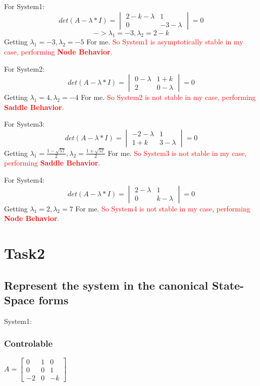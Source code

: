 \documentclass[12pt,a4paper,oneside]{ctexart}
\begin{document}
    For System1:
    $$det(A-\lambda*I) =\begin{vmatrix}
       2-k-\lambda & 1 \\
       0 & -3-\lambda 
    \end{vmatrix} = 0$$
    $$ ->\lambda_1 = -3, \lambda_2 = 2-k $$
    Getting $\lambda_1 = -3, \lambda_2 = -5$ For me.
    \textcolor{red}{So System1 is asymptotically stable in my case, performing \textbf{Node Behavior}.}

    For System2:
    $$det(A-\lambda*I) =\begin{vmatrix}
        0-\lambda & 1+k \\
        2 & 0-\lambda 
     \end{vmatrix} = 0$$
    Getting $\lambda_1 = 4, \lambda_2 = -4$ For me.
    \textcolor{red}{So System2 is not stable in my case, performing \textbf{Saddle Behavior}.}

    For System3:
    $$det(A-\lambda*I) =\begin{vmatrix}
       -2-\lambda & 1 \\
        1+k & 3-\lambda 
     \end{vmatrix} = 0$$
    Getting $\lambda_1 = \frac{1-\sqrt{57}}{2}, \lambda_2 = \frac{1+\sqrt{57}}{2}$ For me.
    \textcolor{red}{So System3 is not stable in my case, performing \textbf{Saddle Behavior}.}

    For System4:
    $$det(A-\lambda*I) =\begin{vmatrix}
        2-\lambda & 1 \\
        0 & k-\lambda 
      \end{vmatrix} = 0$$
    Getting $\lambda_1 = 2, \lambda_2 = 7$ For me.
    \textcolor{red}{So System4 is not stable in my case, performing \textbf{Node Behavior}.}

    \section{Task2}
    \subsection{Represent the system in the canonical State-Space forms}
    System1:
    \subsubsection*{Controlable}
    $A = \begin{bmatrix}
        0&1&0\\
        0&0&1\\
        -2&0&-k
    \end{bmatrix}$
\end{document}
